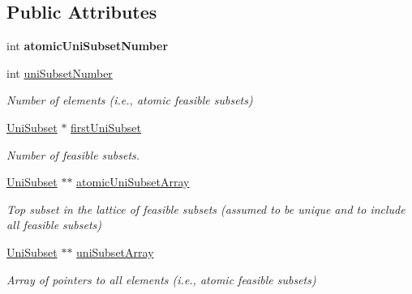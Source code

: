 \subsection*{Public Attributes}
\begin{DoxyCompactItemize}
\item 
\hypertarget{classUniSet_addac67921c058dc9ffa2074b3d59151f}{int {\bfseries atomic\-Uni\-Subset\-Number}}\label{classUniSet_addac67921c058dc9ffa2074b3d59151f}

\item 
\hypertarget{classUniSet_a159ec0413efd05616c2f2445b7d8b2b5}{int \hyperlink{classUniSet_a159ec0413efd05616c2f2445b7d8b2b5}{uni\-Subset\-Number}}\label{classUniSet_a159ec0413efd05616c2f2445b7d8b2b5}

\begin{DoxyCompactList}\small\item\em Number of elements (i.\-e., atomic feasible subsets) \end{DoxyCompactList}\item 
\hypertarget{classUniSet_a8b2ca464176feddcd8d96c75514eba6b}{\hyperlink{classUniSubset}{Uni\-Subset} $\ast$ \hyperlink{classUniSet_a8b2ca464176feddcd8d96c75514eba6b}{first\-Uni\-Subset}}\label{classUniSet_a8b2ca464176feddcd8d96c75514eba6b}

\begin{DoxyCompactList}\small\item\em Number of feasible subsets. \end{DoxyCompactList}\item 
\hypertarget{classUniSet_a16746d02b5503c5d8c62fe4dff46c5b3}{\hyperlink{classUniSubset}{Uni\-Subset} $\ast$$\ast$ \hyperlink{classUniSet_a16746d02b5503c5d8c62fe4dff46c5b3}{atomic\-Uni\-Subset\-Array}}\label{classUniSet_a16746d02b5503c5d8c62fe4dff46c5b3}

\begin{DoxyCompactList}\small\item\em Top subset in the lattice of feasible subsets (assumed to be unique and to include all feasible subsets) \end{DoxyCompactList}\item 
\hypertarget{classUniSet_a154ae422d9f248c8b50f39d575f9b3c0}{\hyperlink{classUniSubset}{Uni\-Subset} $\ast$$\ast$ \hyperlink{classUniSet_a154ae422d9f248c8b50f39d575f9b3c0}{uni\-Subset\-Array}}\label{classUniSet_a154ae422d9f248c8b50f39d575f9b3c0}

\begin{DoxyCompactList}\small\item\em Array of pointers to all elements (i.\-e., atomic feasible subsets) \end{DoxyCompactList}\end{DoxyCompactItemize}
